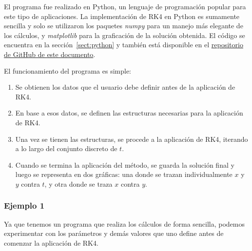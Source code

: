 El programa fue realizado en Python, un lenguaje de programación popular para este tipo de aplicaciones. La implementación de RK4 en Python es sumamente sencilla y solo se utilizaron los paquetes \textit{numpy} para un manejo más elegante de los cálculos, y \textit{matplotlib} para la graficación de la solución obtenida. El código se encuentra en la sección~\ref{sect:python} y también está disponible en el \href{https://github.com/camargomau/runge-kutta}{repositorio de GitHub de este documento}.

El funcionamiento del programa es simple:
\begin{enumerate}
    \item Se obtienen los datos que el usuario debe definir antes de la aplicación de RK4.
    \item En base a esos datos, se definen las estructuras necesarias para la aplicación de RK4.
    \item Una vez se tienen las estructuras, se procede a la aplicación de RK4, iterando a lo largo del conjunto discreto de \(t\).
    \item Cuando se termina la aplicación del método, se guarda la solución final y luego se representa en dos gráficas: una donde se trazan individualmente \(x\) y \(y\) contra \(t\), y otra donde se traza \(x\) contra \(y\).
\end{enumerate}

\subsubsection{Ejemplo 1}

Ya que tenemos un programa que realiza los cálculos de forma sencilla, podemos experimentar con los parámetros y demás valores que uno define antes de comenzar la aplicación de RK4.

